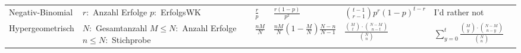 \documentclass[a4paper,10pt]{article}
\begin{document}
\begin{center}
\begin{tabularx}{\textwidth}{llXXXXX}
		Negativ-Binomial &  \makecell[l]{\( r: \) Anzahl Erfolge \\ \( p: \) ErfolgsWK} & $\frac{r}{p}$ & $\frac{r(1-p)}{p^2}$ & ${t - 1 \choose r - 1} p^r (1-p)^{t - r}$ & I'd rather not \\

		Hypergeometrisch &  \makecell[l]{\( N: \) Gesamtanzahl \\ \( M \leq N: \) Anzahl Erfolge \\ \( n \leq N: \) Stichprobe} & $\frac{nM}{N}$ & $\frac{nM}{N} \left( 1 - \frac{M}{N} \right) \frac{N - n}{N - 1}$ & $\frac{\binom{M}{t} \cdot \binom{N - M}{n - t}}{\binom{N}{n}}$ & $\sum_{y=0}^t \frac{\binom{M}{y} \cdot \binom{N - M}{n - y}}{\binom{N}{n}}$ \\

		\bottomrule
	\end{tabularx}
\end{center}
\end{document}
